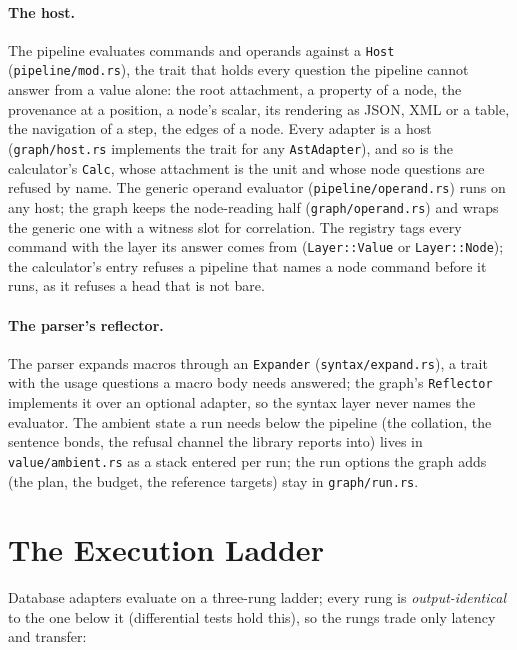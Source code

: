 \documentclass{report}
\begin{document}
\paragraph{The host.} The pipeline evaluates commands and operands
against a \texttt{Host} (\texttt{pipeline/mod.rs}), the trait that
holds every question the pipeline cannot answer from a value alone:
the root attachment, a property of a node, the provenance at a
position, a node's scalar, its rendering as JSON, XML or a table,
the navigation of a step, the edges of a node. Every adapter is a
host (\texttt{graph/host.rs} implements the trait for any
\texttt{AstAdapter}), and so is the calculator's \texttt{Calc},
whose attachment is the unit and whose node questions are refused by
name. The generic operand evaluator (\texttt{pipeline/operand.rs})
runs on any host; the graph keeps the node-reading half
(\texttt{graph/operand.rs}) and wraps the generic one with a witness
slot for correlation. The registry tags every command with the
layer its answer comes from (\texttt{Layer::Value} or
\texttt{Layer::Node}); the calculator's entry refuses a pipeline
that names a node command before it runs, as it refuses a head that
is not bare.

\paragraph{The parser's reflector.} The parser expands macros
through an \texttt{Expander} (\texttt{syntax/expand.rs}), a trait
with the usage questions a macro body needs answered; the graph's
\texttt{Reflector} implements it over an optional adapter, so the
syntax layer never names the evaluator. The ambient state a run
needs below the pipeline (the collation, the sentence bonds, the
refusal channel the library reports into) lives in
\texttt{value/ambient.rs} as a stack entered per run; the run
options the graph adds (the plan, the budget, the reference targets)
stay in \texttt{graph/run.rs}.

\section{The Execution Ladder}\label{sec:ladder}

Database adapters evaluate on a three-rung ladder; every rung is
\emph{output-identical} to the one below it (differential tests
hold this), so the rungs trade only latency and transfer:
\end{document}
